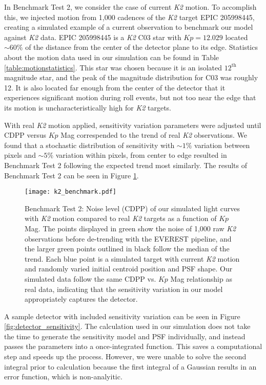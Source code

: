 \documentclass[12pt,preprint]{aastex}
\begin{document}
In Benchmark Test 2, we consider the case of current \textit{K2} motion. To accomplish this, we injected motion from 1,000 cadences of the \textit{K2} target EPIC 205998445, creating a simulated example of a current observation to benchmark our model against \textit{K2} data. EPIC 205998445 is a \textit{K2} C03 star with $Kp = 12.029$ located ${\sim}60\%$ of the distance from the center of the detector plane to its edge. Statistics about the motion data used in our simulation can be found in Table \ref{table:motionstatistics}. This star was chosen because it is an isolated $12^{\text{th}}$ magnitude star, and the peak of the magnitude distribution for C03 was roughly 12. It is also located far enough from the center of the detector that it experiences significant motion during roll events, but not too near the edge that its motion is uncharacteristically high for \textit{K2} targets.

With real \textit{K2} motion applied, sensitivity variation parameters were adjusted until CDPP versus $Kp$ Mag correspended to the trend of real \textit{K2} observations. We found that a stochastic distribution of sensitivity with ${\sim}1\%$ variation between pixels and ${\sim}5\%$ variation within pixels, from center to edge resulted in Benchmark Test 2 following the expected trend most similarly. The results of Benchmark Test 2 can be seen in Figure \ref{fig:1motion}.

\begin{figure}[h]
	\centering
	\texttt{[image: k2\_benchmark.pdf]}
	\caption{Benchmark Test 2: Noise level (CDPP) of our simulated light curves with \textit{K2} motion compared to real \textit{K2} targets as a function of $Kp$ Mag. The points displayed in green show the noise of 1,000 raw \textit{K2} observations before de-trending with the EVEREST pipeline, and the larger green points outlined in black follow the median of the trend. Each blue point is a simulated target with current \textit{K2} motion and randomly varied initial centroid position and PSF shape. Our simulated data follow the same CDPP vs. $Kp$ Mag relationship as real data, indicating that the sensitivity variation in our model appropriately captures the detector.}
	\label{fig:1motion}
\end{figure}

A sample detector with included sensitivity variation can be seen in Figure \ref{fig:detector_sensitivity}. The calculation used in our simulation does not take the time to generate the sensitivity model and PSF individually, and instead passes the parameters into a once-integrated function. This saves a computational step and speeds up the process. However, we were unable to solve the second integral prior to calculation because the first integral of a Gaussian results in an error function, which is non-analyitic.
\end{document}

